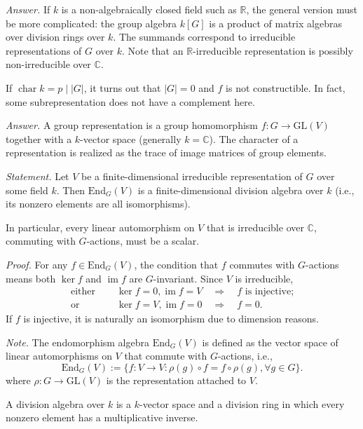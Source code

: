 \documentclass{mathproblems}
\newcommand\C{\mathbb{C}}
\newcommand\R{\mathbb{R}}
\newcommand\End{\mathrm{End}}
\newcommand\GL{\mathrm{GL}}
\begin{document}
\begin{questions}
\textit{Answer.} If $k$ is a non-algebraically closed field such as $\R$, the general version must be more complicated: the group algebra $k[G]$ is a product of matrix algebras over division rings over $k$. The summands correspond to irreducible representations of $G$ over $k$. Note that an $\R$-irreducible representation is possibly non-irreducible over $\C$.

If $\operatorname{char} k=p\mid |G|$, it turns out that $|G|=0$ and $f$ is not constructible. In fact, some subrepresentation does not have a complement here.


\textit{Answer.} A group representation is a group homomorphism $f: G\to \GL(V)$ together with a $k$-vector space (generally $k=\C$). The character of a representation is realized as the trace of image matrices of group elements.



{\color{violet}
\textit{Statement.} Let $V$ be a finite-dimensional irreducible representation of $G$ over some field $k$. Then $\End_G(V)$ is a finite-dimensional division algebra over $k$ (i.e., its nonzero elements are all isomorphisms).

In particular, every linear automorphism on $V$ that is irreducible over $\C$, commuting with $G$-actions, must be a scalar.}

\textit{Proof.} For any $f\in \End_G(V)$, the condition that $f$ commutes with $G$-actions means both $\ker f$ and $\operatorname{im} f$ are $G$-invariant. Since $V$ is irreducible,
$$
\begin{aligned}
\text{either }\quad & \ker f=0, \operatorname{im} f=V \quad \Longrightarrow \quad f \text{ is injective;}\\
\text{or }\quad & \ker f=V, \operatorname{im} f=0 \quad \Longrightarrow \quad f=0.
\end{aligned}
$$
If $f$ is injective, it is naturally an isomorphism due to dimension reasons.

\textit{Note.} The endomorphism algebra $\End_G(V)$ is defined as the vector space of linear automorphisms on $V$ that commute with $G$-actions, i.e.,
$$
\End_G(V):=\{f:V\to V: \rho(g)\circ f=f\circ \rho(g), \forall g\in G\}.
$$
where $\rho: G\to \GL(V)$ is the representation attached to $V$.

A division algebra over $k$ is a $k$-vector space and a division ring in which every nonzero element has a multiplicative inverse.


\end{questions}
\end{document}
